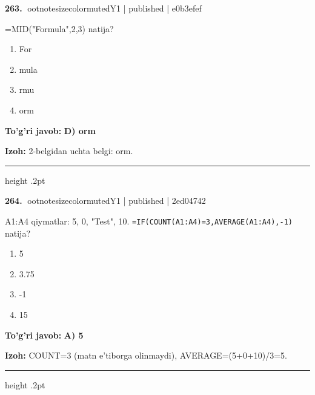 \documentclass[10pt,a4paper]{article}
\begin{document}
\textbf{\color{ink}263.} {ootnotesizecolor{muted}Y1 | published | e0b3efef}
\par
=MID("Formula",2,3) natija?
\begin{enumerate}[label=\Alph*),leftmargin=9mm]
\item For
\item mula
\item rmu
\item orm
\end{enumerate}
\begin{tcolorbox}[enhanced,breakable,colback=teal!4,colframe=teal!55!black,boxrule=0.45pt,arc=1.2mm,left=2.8mm,right=2.8mm,top=2mm,bottom=2mm]
\textbf{\color{teal}To'g'ri javob:} \textbf{D) orm}
\par\smallskip
\textbf{Izoh:} 2-belgidan uchta belgi: orm.
\end{tcolorbox}
\vspace{2mm}\hrule height .2pt\vspace{2mm}

\textbf{\color{ink}264.} {ootnotesizecolor{muted}Y1 | published | 2ed04742}
\par
A1:A4 qiymatlar: 5, 0, "Test", 10. \texttt{=IF(COUNT(A1:A4)=3,AVERAGE(A1:A4),-1)} natija?
\begin{enumerate}[label=\Alph*),leftmargin=9mm]
\item 5
\item 3.75
\item -1
\item 15
\end{enumerate}
\begin{tcolorbox}[enhanced,breakable,colback=teal!4,colframe=teal!55!black,boxrule=0.45pt,arc=1.2mm,left=2.8mm,right=2.8mm,top=2mm,bottom=2mm]
\textbf{\color{teal}To'g'ri javob:} \textbf{A) 5}
\par\smallskip
\textbf{Izoh:} COUNT=3 (matn e'tiborga olinmaydi), AVERAGE=(5+0+10)/3=5.
\end{tcolorbox}
\vspace{2mm}\hrule height .2pt\vspace{2mm}
\end{document}

